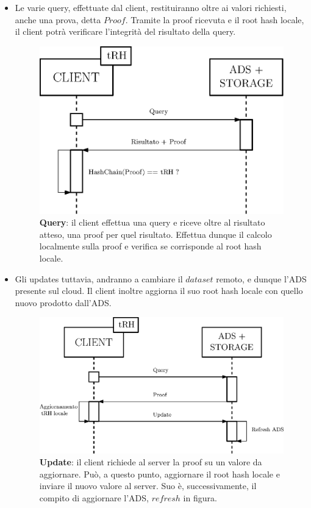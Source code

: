 		\begin{itemize}
			\item Le varie query, effettuate dal client, restituiranno oltre ai valori richiesti, anche una prova, detta $ Proof $. Tramite la proof ricevuta e il root hash locale, il client potrà verificare l'integrità del risultato della query.
			
			\begin{figure}
				\centering
				\includegraphics[scale=0.75]{figure/queryADS.eps}
				\caption{\textbf{Query}: il client effettua una query e riceve oltre al risultato atteso, una proof per quel risultato. Effettua dunque il calcolo localmente sulla proof e verifica se corrisponde al root hash locale.}\label{fig:4}
			\end{figure}
			
			\item Gli updates tuttavia, andranno a cambiare il $ dataset $ remoto, e dunque l'ADS presente sul cloud. Il client inoltre aggiorna il suo root hash locale con quello nuovo prodotto dall'ADS.
			
			\begin{figure}
				\centering
				\includegraphics[scale=0.75]{figure/updateADS.eps}
				\caption{\textbf{Update}: il client richiede al server la proof su un valore da aggiornare. Può, a questo punto, aggiornare il root hash locale e inviare il nuovo valore al server. Suo è, successivamente, il compito di aggiornare l'ADS, $ refresh $ in figura.}\label{fig:5}
			\end{figure}
		
		\end{itemize}
	
